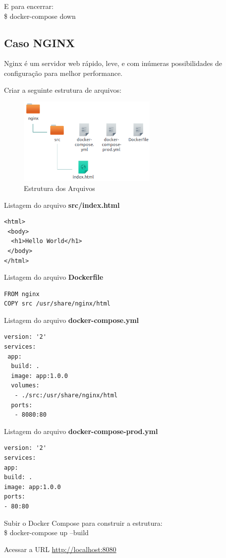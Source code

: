\documentclass[a4paper,11pt]{article}
\begin{document}
E para encerrar: \\
{\ttfamily\$ docker-compose down}

\subsection{Caso NGINX}
Nginx é um servidor web rápido, leve, e com inúmeras possibilidades de configuração para melhor performance. 

Criar a seguinte estrutura de arquivos:
\begin{figure}[!htb]
	\centering
	\includegraphics[width=0.6\textwidth]{imagem/estnginx.png}
	\caption{Estrutura dos Arquivos}
\end{figure}

Listagem do arquivo \textbf{src/index.html}
\begin{lstlisting}
<html>
 <body>
  <h1>Hello World</h1>
 </body>
</html>
\end{lstlisting}

Listagem do arquivo \textbf{Dockerfile}
\begin{lstlisting}
FROM nginx
COPY src /usr/share/nginx/html
\end{lstlisting}

Listagem do arquivo \textbf{docker-compose.yml}
\begin{lstlisting}
version: '2'
services:
 app:
  build: .
  image: app:1.0.0
  volumes:
   - ./src:/usr/share/nginx/html
  ports:
   - 8080:80 
\end{lstlisting}

Listagem do arquivo \textbf{docker-compose-prod.yml}
\begin{lstlisting}
version: '2'
services:
app:
build: .
image: app:1.0.0
ports:
- 80:80 
\end{lstlisting}

Subir o Docker Compose para construir a estrutura: \\
{\ttfamily\$ docker-compose up --build}

Acessar a URL \url{http://localhost:8080}
\end{document}
